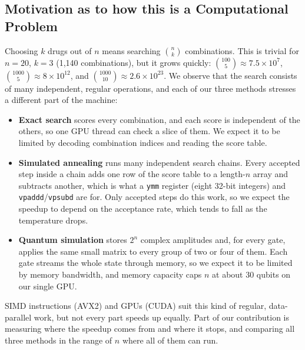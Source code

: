 \subsection{Motivation as to how this is a Computational Problem}

Choosing $k$ drugs out of $n$ means searching $\binom{n}{k}$ combinations. This is trivial for $n=20$, $k=3$ (1{,}140 combinations), but it grows quickly: $\binom{100}{5}\approx 7.5\times 10^{7}$, $\binom{1000}{5}\approx 8\times 10^{12}$, and $\binom{1000}{10}\approx 2.6\times 10^{23}$. We observe that the search consists of many independent, regular operations, and each of our three methods stresses a different part of the machine:
\begin{itemize}
\item \textbf{Exact search} scores every combination, and each score is independent of the others, so one GPU thread can check a slice of them. We expect it to be limited by decoding combination indices and reading the score table.
\item \textbf{Simulated annealing} runs many independent search chains. Every accepted step inside a chain adds one row of the score table to a length-$n$ array and subtracts another, which is what a \texttt{ymm} register (eight 32-bit integers) and \texttt{vpaddd}/\texttt{vpsubd} are for. Only accepted steps do this work, so we expect the speedup to depend on the acceptance rate, which tends to fall as the temperature drops.
\item \textbf{Quantum simulation} stores $2^n$ complex amplitudes and, for every gate, applies the same small matrix to every group of two or four of them. Each gate streams the whole state through memory, so we expect it to be limited by memory bandwidth, and memory capacity caps $n$ at about 30 qubits on our single GPU.
\end{itemize}
SIMD instructions (AVX2) and GPUs (CUDA) suit this kind of regular, data-parallel work, but not every part speeds up equally. Part of our contribution is measuring where the speedup comes from and where it stops, and comparing all three methods in the range of $n$ where all of them can run.


